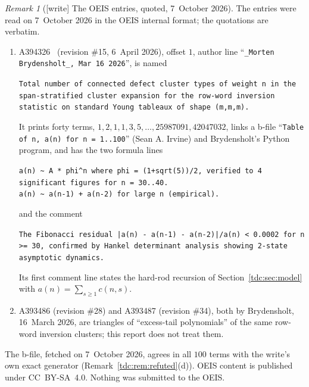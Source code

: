 \documentclass[11pt]{article}
\theoremstyle{definition}\newtheorem{definition}[theorem]{Definition}
\theoremstyle{remark}\newtheorem{remark}[theorem]{Remark}
\begin{document}
\begin{remark}[{[write]} The OEIS entries, quoted, 7~October 2026]\label{tdc:rem:oeis}
The entries were read on 7~October 2026 in the OEIS internal format; the
quotations are verbatim.
\begin{enumerate}[label=(\alph*)]\raggedright
\item A394326~\cite{oeis} (revision \#15, 6~April 2026), offset $1$, author
 line ``\texttt{\_Morten Brydensholt\_, Mar 16 2026}'', is named
 \begin{center}\small
 \parbox{0.92\textwidth}{\raggedright\texttt{Total number of connected defect cluster types of weight n in the span-stratified cluster expansion for the row-word inversion statistic on standard Young tableaux of shape (m,m,m).}}
 \end{center}
 It prints forty terms, $1,2,1,1,3,5,\dots,25987091,42047032$, links a b-file
 ``\texttt{Table of n, a(n) for n = 1..100}'' (Sean A. Irvine) and
 Brydensholt's Python program, and has the two formula lines
 \begin{center}\small
 \parbox{0.92\textwidth}{\raggedright\texttt{a(n) \textasciitilde{} A * phi\^{}n where phi = (1+sqrt(5))/2, verified to 4 significant figures for n = 30..40.}\\[2pt]
 \texttt{a(n) \textasciitilde{} a(n-1) + a(n-2) for large n (empirical).}}
 \end{center}
 and the comment
 \begin{center}\small
 \parbox{0.92\textwidth}{\raggedright\texttt{The Fibonacci residual |a(n) - a(n-1) - a(n-2)|/a(n) < 0.0002 for n >= 30, confirmed by Hankel determinant analysis showing 2-state asymptotic dynamics.}}
 \end{center}
 Its first comment line states the hard-rod recursion of
 Section~\ref{tdc:sec:model} with $a(n)=\sum_{s\ge1}c(n,s)$.
\item A393486 (revision \#28) and A393487 (revision \#34), both by
 Brydensholt, 16~March 2026, are triangles of ``excess-tail polynomials'' of
 the same row-word inversion clusters; this report does not treat them.
\end{enumerate}
The b-file, fetched on 7~October 2026, agrees in all $100$ terms with the
write's own exact generator (Remark~\ref{tdc:rem:refuted}(d)). OEIS content is
published under CC~BY-SA~4.0. Nothing was submitted to the OEIS.
\end{remark}
\end{document}
